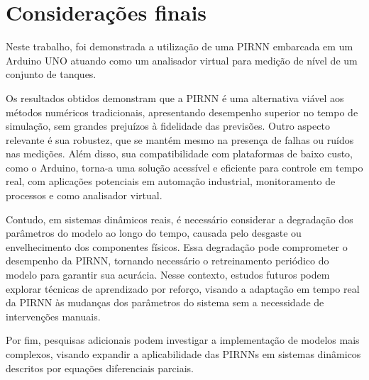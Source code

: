 \section{Considerações finais}

Neste trabalho, foi demonstrada a utilização de uma PIRNN embarcada em um Arduino UNO atuando como um analisador virtual para medição de nível de um conjunto de tanques.

Os resultados obtidos demonstram que a PIRNN é uma alternativa viável aos métodos numéricos tradicionais, apresentando desempenho superior no tempo de simulação, sem grandes prejuízos à fidelidade das previsões. Outro aspecto relevante é sua robustez, que se mantém mesmo na presença de falhas ou ruídos nas medições. Além disso, sua compatibilidade com plataformas de baixo custo, como o Arduino, torna-a uma solução acessível e eficiente para controle em tempo real, com aplicações potenciais em automação industrial, monitoramento de processos e como analisador virtual.

Contudo, em sistemas dinâmicos reais, é necessário considerar a degradação dos parâmetros do modelo ao longo do tempo, causada pelo desgaste ou envelhecimento dos componentes físicos. Essa degradação pode comprometer o desempenho da PIRNN, tornando necessário o retreinamento periódico do modelo para garantir sua acurácia. Nesse contexto, estudos futuros podem explorar técnicas de aprendizado por reforço, visando a adaptação em tempo real da PIRNN às mudanças dos parâmetros do sistema sem a necessidade de intervenções manuais.

Por fim, pesquisas adicionais podem investigar a implementação de modelos mais complexos, visando expandir a aplicabilidade das PIRNNs em sistemas dinâmicos descritos por equações diferenciais parciais.
